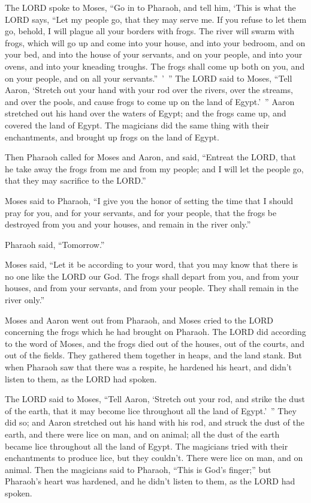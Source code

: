 \mychapter{} \myverse*{}The LORD spoke to Moses, “Go in to Pharaoh, and tell him, ‘This is what the LORD says, “Let my people go, that they may serve me. \myverse{}If you refuse to let them go, behold, I will plague all your borders with frogs. \myverse{}The river will swarm with frogs, which will go up and come into your house, and into your bedroom, and on your bed, and into the house of your servants, and on your people, and into your ovens, and into your kneading troughs. \myverse{}The frogs shall come up both on you, and on your people, and on all your servants.” ’ ” \myverse{}The LORD said to Moses, “Tell Aaron, ‘Stretch out your hand with your rod over the rivers, over the streams, and over the pools, and cause frogs to come up on the land of Egypt.’ ” \myverse{}Aaron stretched out his hand over the waters of Egypt; and the frogs came up, and covered the land of Egypt. \myverse{}The magicians did the same thing with their enchantments, and brought up frogs on the land of Egypt.


\myverse{}Then Pharaoh called for Moses and Aaron, and said, “Entreat the LORD, that he take away the frogs from me and from my people; and I will let the people go, that they may sacrifice to the LORD.”


\myverse{}Moses said to Pharaoh, “I give you the honor of setting the time that I should pray for you, and for your servants, and for your people, that the frogs be destroyed from you and your houses, and remain in the river only.”


\myverse{}Pharaoh said, “Tomorrow.”

Moses said, “Let it be according to your word, that you may know that there is no one like the LORD our God. \myverse{}The frogs shall depart from you, and from your houses, and from your servants, and from your people. They shall remain in the river only.”


\myverse{}Moses and Aaron went out from Pharaoh, and Moses cried to the LORD concerning the frogs which he had brought on Pharaoh. \myverse{}The LORD did according to the word of Moses, and the frogs died out of the houses, out of the courts, and out of the fields. \myverse{}They gathered them together in heaps, and the land stank. \myverse{}But when Pharaoh saw that there was a respite, he hardened his heart, and didn’t listen to them, as the LORD had spoken.


\myverse{}The LORD said to Moses, “Tell Aaron, ‘Stretch out your rod, and strike the dust of the earth, that it may become lice throughout all the land of Egypt.’ ” \myverse{}They did so; and Aaron stretched out his hand with his rod, and struck the dust of the earth, and there were lice on man, and on animal; all the dust of the earth became lice throughout all the land of Egypt. \myverse{}The magicians tried with their enchantments to produce lice, but they couldn’t. There were lice on man, and on animal. \myverse{}Then the magicians said to Pharaoh, “This is God’s finger;” but Pharaoh’s heart was hardened, and he didn’t listen to them, as the LORD had spoken.


